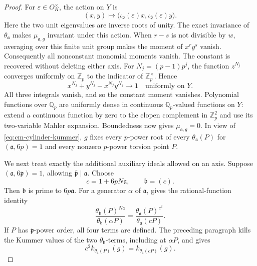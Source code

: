 \begin{proof}
For \(\varepsilon\in O_K^\times\), the action on \(Y\) is
\[
 (x,y)\longmapsto
        \bigl(\iota_{\mathfrak p}(\varepsilon)x,
              \iota_{\bar{\mathfrak p}}(\varepsilon)y\bigr).
\]
Here the two unit eigenvalues are inverse roots of unity.
The exact invariance of \(\theta_{\mathfrak a}\) makes
\(\mu_{\mathfrak a,g}\) invariant under this action.
When \(r-s\) is not divisible by \(w\), averaging over this finite
unit group makes the moment of \(x^ry^s\) vanish.
Consequently all nonconstant monomial moments vanish.
The constant is recovered without deleting either axis.
For \(N_j=(p-1)p^j\), the function \(z^{N_j}\) converges uniformly
on \(\mathbb Z_p\) to the indicator of \(\mathbb Z_p^\times\).
Hence
\[
             x^{N_j}+y^{N_j}-x^{N_j}y^{N_j}
                         \longrightarrow1\quad\text{uniformly on }Y.
\]
All three integrals vanish, and so the constant moment vanishes.
Polynomial functions over \(\mathbb Q_p\) are uniformly dense in
continuous \(\mathbb Q_p\)-valued functions on \(Y\):
extend a continuous function by zero to the clopen complement in
\(\mathbb Z_p^2\) and use its two-variable Mahler expansion.
Boundedness now gives \(\mu_{\mathfrak a,g}=0\).
In view of \eqref{eq:cm-cylinder-kummer}, \(g\) fixes every \(p\)-power
root of every \(\theta_{\mathfrak a}(P)\) for
\((\mathfrak a,6p)=1\) and every nonzero \(p\)-power torsion point
\(P\).

We next treat exactly the additional auxiliary ideals allowed on
an axis.  Suppose \((\mathfrak a,6\mathfrak p)=1\), allowing
\(\bar{\mathfrak p}\mid\mathfrak a\).
Choose
\[
              c=1+6pN\mathfrak a,\qquad \mathfrak b=(c).
\]
Then \(\mathfrak b\) is prime to \(6p\mathfrak a\).
For a generator \(\alpha\) of \(\mathfrak a\),
\cite[Lemma 2.4, p.~7]{IshiiSoule} gives the rational-function
identity
\[
 \frac{\theta_{\mathfrak b}(P)^{N\mathfrak a}}
      {\theta_{\mathfrak b}(\alpha P)}
 =
 \frac{\theta_{\mathfrak a}(P)^{c^2}}
      {\theta_{\mathfrak a}(cP)}.
\]
If \(P\) has \(\mathfrak p\)-power order, all four terms are defined.
The preceding paragraph kills the Kummer values of the two
\(\theta_{\mathfrak b}\)-terms, including at \(\alpha P\), and gives
\begin{equation}\label{eq:cm-auxiliary-axis}
 c^2 k_{\theta_{\mathfrak a}(P)}(g)
                      =k_{\theta_{\mathfrak a}(cP)}(g).
\end{equation}


\end{proof}
